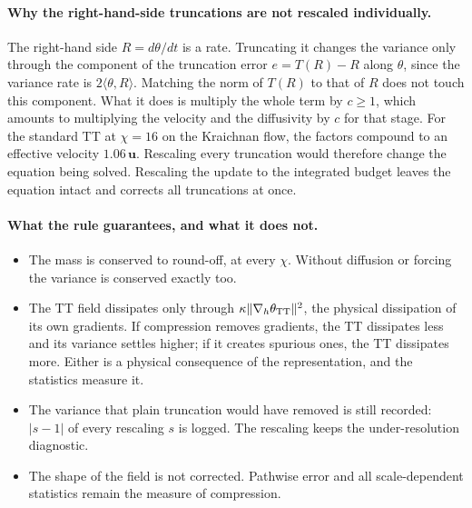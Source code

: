 \documentclass[aps,prfluids,reprint,onecolumn,amsmath,amssymb,nofootinbib,floatfix]{revtex4-2}
\begin{document}
\paragraph{Why the right-hand-side truncations are not rescaled individually.}
The right-hand side $R=d\theta/dt$ is a rate. Truncating it changes the variance
only through the component of the truncation error $e=T(R)-R$ along $\theta$,
since the variance rate is $2\langle\theta,R\rangle$. Matching the norm of $T(R)$
to that of $R$ does not touch this component. What it does is multiply the whole
term by $c\ge1$, which amounts to multiplying the velocity and the diffusivity by
$c$ for that stage. For the standard TT at $\chi=16$ on the Kraichnan flow, the
factors compound to an effective velocity $1.06\,\mathbf{u}$. Rescaling every
truncation would therefore change the equation being solved. Rescaling the
update to the integrated budget leaves the equation intact and corrects all
truncations at once.

\paragraph{What the rule guarantees, and what it does not.}
\begin{itemize}
\item The mass is conserved to round-off, at every $\chi$. Without diffusion or
      forcing the variance is conserved exactly too.
\item The TT field dissipates only through $\kappa\|\nabla_h\theta_{\rm TT}\|^2$,
      the physical dissipation of its own gradients. If compression removes
      gradients, the TT dissipates less and its variance settles higher; if it
      creates spurious ones, the TT dissipates more. Either is a physical
      consequence of the representation, and the statistics measure it.
\item The variance that plain truncation would have removed is still recorded:
      $|s-1|$ of every rescaling $s$ is logged. The rescaling keeps the
      under-resolution diagnostic.
\item The shape of the field is not corrected. Pathwise error and all
      scale-dependent statistics remain the measure of compression.
\end{itemize}
\end{document}
